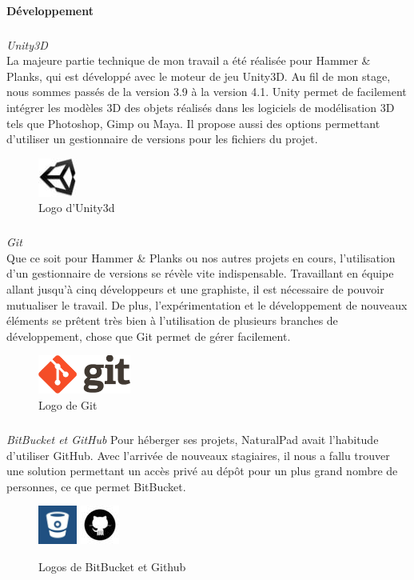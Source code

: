 		\paragraph{Développement}
		\subparagraph{} \emph{Unity3D\\}
La majeure partie technique de mon travail a été réalisée pour Hammer \& Planks, qui est développé avec le moteur de jeu Unity3D. Au fil de mon stage, nous sommes passés de la version 3.9 à la version 4.1. Unity permet de facilement intégrer les modèles 3D des objets réalisés dans les logiciels de modélisation 3D tels que Photoshop, Gimp ou Maya. Il propose aussi des options permettant d'utiliser un gestionnaire de versions pour les fichiers du projet.
	\begin{figure}[!h]
		\centering
		\includegraphics[height=48px]{images/unity.jpg}
		\caption{Logo d'Unity3d}
		\label{Logo d'Unity3d}
	\end{figure}

		\subparagraph{} \emph{Git\\}
Que ce soit pour Hammer \& Planks ou nos autres projets en cours, l'utilisation d'un gestionnaire de versions se révèle vite indispensable. Travaillant en équipe allant jusqu'à cinq développeurs et une graphiste, il est nécessaire de pouvoir mutualiser le travail. De plus, l'expérimentation et le développement de nouveaux éléments se prêtent très bien à l'utilisation de plusieurs branches de développement, chose que Git permet de gérer facilement.
	\begin{figure}[!h]
		\centering
		\includegraphics[height=48px]{images/git.png}
		\caption{Logo de Git}
		\label{Logo de Git}
	\end{figure}

		\subparagraph{}	\emph{BitBucket et GitHub}
Pour héberger ses projets, NaturalPad avait l'habitude d'utiliser GitHub. Avec l'arrivée de nouveaux stagiaires, il nous a fallu trouver une solution permettant un accès privé au dépôt pour un plus grand nombre de personnes, ce que permet BitBucket.
	\begin{figure}[!h]
		\centering
		\includegraphics[height=48px]{images/bitbucket.jpg}
		\includegraphics[height=48px]{images/github.jpg}
		\caption{Logos de BitBucket et Github}
		\label{Logos de BitBucket et Github}
	\end{figure}

